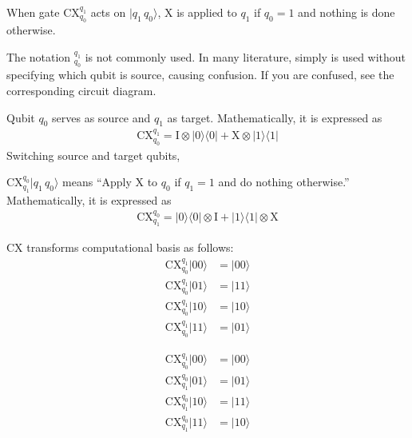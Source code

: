 \documentclass[letterpaper,10pt,english]{jupyterBook}
\begin{document}
\sphinxAtStartPar
When gate CX\(_{q_0}^{q_1}\) acts on \(|q_1\, q_0\rangle\), X is applied to \(q_1\) if \(q_0=1\) and nothing is done otherwise.%
\begin{footnote}[1]\sphinxAtStartFootnote
The notation \(_{q_0}^{q_1}\) is not commonly used.  In many literature, simply  is used without specifying which qubit is source, causing confusion. If you are confused, see the corresponding circuit diagram.
%
\end{footnote} Qubit \(q_0\) serves as source and \(q_1\) as target. Mathematically, it is expressed as
\begin{equation*}
\begin{split}
\text{CX}_{q_0}^{q_1} = \text{I} \otimes |0\rangle\langle 0| + \text{X} \otimes |1\rangle\langle 1|
\end{split}
\end{equation*}
\sphinxAtStartPar
Switching source and target qubits,

\sphinxAtStartPar
CX\(_{q_1}^{q_0}|q_1\, q_0\rangle\) means “Apply X to \(q_0\) if \(q_1=1\) and do nothing otherwise.”  Mathematically, it is expressed as
\begin{equation*}
\begin{split}
\text{CX}_{q_1}^{q_0} = |0\rangle\langle 0| \otimes \text{I}   +   |1\rangle\langle 1| \otimes \text{X}
\end{split}
\end{equation*}
\sphinxAtStartPar
{}

\sphinxAtStartPar
CX transforms computational basis as follows:
\begin{align}
\text{CX}_{q_0}^{q_1} \lvert 00\rangle &= \lvert 00\rangle \\
\text{CX}_{q_0}^{q_1} \lvert 01\rangle &= \lvert 11\rangle \\
\text{CX}_{q_0}^{q_1} \lvert 10\rangle &= \lvert 10\rangle \\
\text{CX}_{q_0}^{q_1} \lvert 11\rangle &= \lvert 01\rangle
\end{align}

\begin{align}
\text{CX}_{q_0}^{q_1} \lvert 00\rangle &= \lvert 00\rangle \\
\text{CX}_{q_1}^{q_0} \lvert 01\rangle &= \lvert 01\rangle \\
\text{CX}_{q_1}^{q_0} \lvert 10\rangle &= \lvert 11\rangle \\
\text{CX}_{q_1}^{q_0} \lvert 11\rangle &= \lvert 10\rangle
\end{align}
\end{document}
